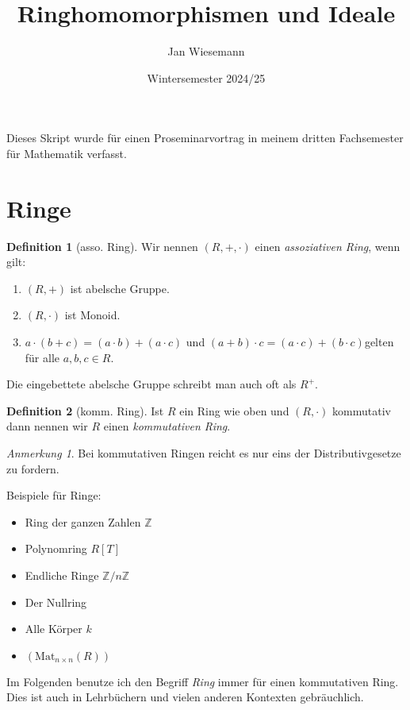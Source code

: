 \documentclass{article}
\theoremstyle{definition}
\newtheorem*{definition}{Definition}
\theoremstyle{remark}
\newtheorem*{anm}{Anmerkung}
\begin{document}
\title{\bf{Ringhomomorphismen und Ideale}}
\author{Jan Wiesemann}
\date{Wintersemester 2024/25}
\maketitle

Dieses Skript wurde für einen Proseminarvortrag in meinem dritten Fachsemester für Mathematik verfasst.

\section{Ringe}

\begin{definition}[asso. Ring] Wir nennen $(R,+,\cdot)$ einen \emph{assoziativen Ring}, wenn gilt:
\begin{enumerate}[label=(\roman*)]
    \item $(R,+)$ ist abelsche Gruppe.
    \item $(R,\cdot)$ ist Monoid.
    \item $a\cdot(b+c)=(a\cdot b)+(a\cdot c)$ und $(a+b)\cdot c=(a\cdot c)+(b\cdot c)$gelten für alle
        $a,b,c\in R$.
\end{enumerate}
\end{definition}

Die eingebettete abelsche Gruppe schreibt man auch oft als $R^+$.

\begin{definition}[komm. Ring] Ist $R$ ein Ring wie oben und $(R,\cdot)$ kommutativ dann nennen wir $R$
    einen \emph{kommutativen Ring}.
\end{definition}

\begin{anm} Bei kommutativen Ringen reicht es nur eins der Distributivgesetze zu fordern.
\end{anm}

Beispiele für Ringe: \begin{itemize}
    \item Ring der ganzen Zahlen $\mathbb{Z}$
    \item Polynomring $R[T]$
    \item Endliche Ringe $\mathbb{Z}\slash n\mathbb{Z}$
    \item Der Nullring
    \item Alle Körper $k$
    \item $(\mathrm{Mat}_{n\times n}(R))$
\end{itemize}

Im Folgenden benutze ich den Begriff \emph{Ring} immer für einen kommutativen Ring.
Dies ist auch in Lehrbüchern und vielen anderen Kontexten gebräuchlich.
\end{document}
